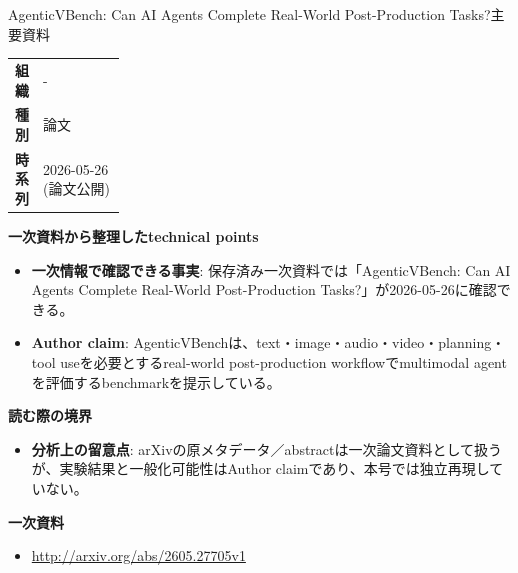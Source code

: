 \begin{technicalnote}{AgenticVBench: Can AI Agents Complete Real-World Post-Production Tasks?}{主要資料}
\begingroup
\begin{tabularx}{\linewidth}{@{}>{\bfseries}p{0.22\linewidth}X@{}}
組織 & - \\
種別 & 論文 \\
時系列 & 2026-05-26 (論文公開) \\
\end{tabularx}
\smallskip
{\bfseries 一次資料から整理したtechnical points}
\begin{itemize}[leftmargin=1.5em,itemsep=0.35em]
\item \textbf{一次情報で確認できる事実}: 保存済み一次資料では「AgenticVBench: Can AI Agents Complete Real-World Post-Production Tasks?」が2026-05-26に確認できる。
\item \textbf{Author claim}: AgenticVBenchは、text・image・audio・video・planning・tool useを必要とするreal-world post-production workflowでmultimodal agentを評価するbenchmarkを提示している。
\end{itemize}
{\bfseries 読む際の境界}
\begin{itemize}[leftmargin=1.5em,itemsep=0.35em]
\item \textbf{分析上の留意点}: arXivの原メタデータ／abstractは一次論文資料として扱うが、実験結果と一般化可能性はAuthor claimであり、本号では独立再現していない。
\end{itemize}
\begin{samepage}
{\bfseries 一次資料}
\begingroup\sloppy
\begin{itemize}[leftmargin=1.5em,itemsep=0.25em]
\item {\scriptsize\url{http://arxiv.org/abs/2605.27705v1}}
\end{itemize}
\endgroup
\end{samepage}
\endgroup
\end{technicalnote}
\medskip

